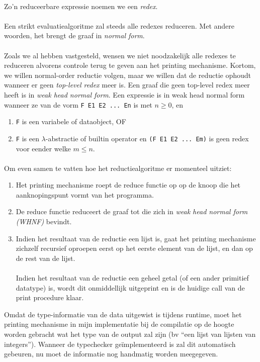 \documentclass[a4paper,10pt]{article}
\begin{document}
\paragraph{}
Zo'n reduceerbare expressie noemen we een \emph{redex}.
\paragraph{}
Een strikt evaluatiealgoritme zal steeds alle redexes reduceren.
Met andere woorden, het brengt de graaf in \emph{normal form}.
\paragraph{}
Zoals we al hebben vastgesteld, wensen we niet noodzakelijk alle redexes te reduceren alvorens controle terug te geven aan het printing mechanisme.
Kortom, we willen normal-order reductie volgen, maar we willen dat de reductie ophoudt wanneer er geen \emph{top-level redex} meer is.
Een graaf die geen top-level redex meer heeft is in \emph{weak head normal form}.
Een expressie is in weak head normal form wanneer ze van de vorm \texttt{F E1 E2 ... En} is met $n \geq 0$, en
\begin{enumerate}
\item \texttt{F} is een variabele of dataobject, OF
\item \texttt{F} is een $\lambda$-abstractie of builtin operator en \texttt{(F E1 E2 ... Em)} is geen redex voor eender welke $m \leq n$.
\end{enumerate}
\paragraph{}
Om even samen te vatten hoe het reductiealgoritme er momenteel uitziet:
\begin{enumerate}
\item
  Het printing mechanisme roept de reduce functie op op de knoop die het aanknopingspunt vormt van het programma.
\item
  De reduce functie reduceert de graaf tot die zich in \emph{weak head normal form (WHNF)} bevindt.
\item
  Indien het resultaat van de reductie een lijst is, gaat het printing mechanisme zichzelf recursief oproepen eerst op het eerste element van de lijst, en dan op de rest van de lijst.
  \paragraph{}
  Indien het resultaat van de reductie een geheel getal (of een ander primitief datatype) is, wordt dit onmiddellijk uitgeprint en is de huidige call van de print procedure klaar.
\end{enumerate}
Omdat de type-informatie van de data uitgewist is tijdens runtime, moet het printing mechanisme in mijn implementatie bij de compilatie op de hoogte worden gebracht wat het type van de output zal zijn (bv ``een lijst van lijsten van integers'').
Wanneer de typechecker ge{\"i}mplementeerd is zal dit automatisch gebeuren, nu moet de informatie nog handmatig worden meegegeven.
\end{document}
